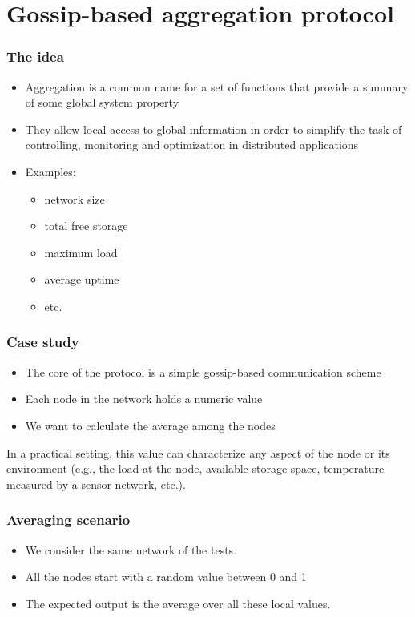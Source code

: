 \documentclass{beamer}
\begin{document}
\section{Gossip-based aggregation protocol}

\begin{frame}
\frametitle{The idea}

\begin{itemize}
  \item Aggregation is a common name for a set of functions that provide a summary of some global system property
  \item They allow local access to global information in order to simplify the task of controlling, monitoring and optimization in distributed applications
  \item Examples:
  \begin{itemize}
    \item network size
    \item total free storage
    \item maximum load
    \item average uptime
    \item etc.
  \end{itemize}
\end{itemize}

\end{frame}

\begin{frame}
\frametitle{Case study}

\begin{itemize}
  \item The core of the protocol is a simple gossip-based communication scheme
  \item Each node in the network holds a numeric value
  \item We want to calculate the average among the nodes
\end{itemize}

In a practical setting, this value can characterize any aspect of the node or its environment (e.g., the load at the node, available storage space, temperature measured by a sensor network, etc.).

\end{frame}

\begin{frame}
\frametitle{Averaging scenario}

\begin{itemize}
  \item We consider the same network of the tests.
  \item All the nodes start with a random value between 0 and 1
  \item The expected output is the average over all these local values.
\end{itemize}
\end{frame}
\end{document}
